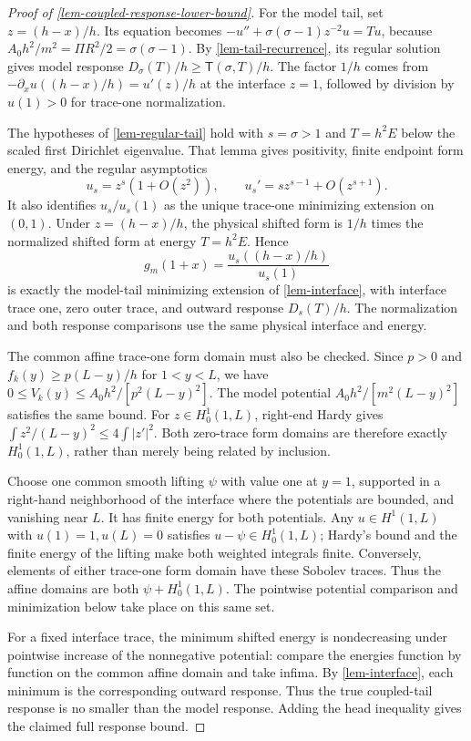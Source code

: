 \documentclass[11pt,a4paper]{article}
\theoremstyle{proofmanuscript}
\begin{document}
\begin{proof}[Proof of \ref{lem-coupled-response-lower-bound}]
For the model tail, set \(z=(h-x)/h\). Its equation becomes \(-u''+\sigma(\sigma-1)z^{-2}u=Tu\), because \(A_0h^2/m^2=\Pi R^2/2=\sigma(\sigma-1)\). By \ref{lem-tail-recurrence}, its regular solution gives model response \(D_\sigma(T)/h\ge\mathsf T(\sigma,T)/h\). The factor \(1/h\) comes from \(-\partial_x u((h-x)/h)=u'(z)/h\) at the interface \(z=1\), followed by division by \(u(1)>0\) for trace-one normalization.

The hypotheses of \ref{lem-regular-tail} hold with \(s=\sigma>1\) and \(T=h^2E\) below the scaled first Dirichlet eigenvalue. That lemma gives positivity, finite endpoint form energy, and the regular asymptotics \[
u_s=z^s(1+O(z^2)),\qquad
u_s'=s z^{s-1}+O(z^{s+1}).
\] It also identifies \(u_s/u_s(1)\) as the unique trace-one minimizing extension on \((0,1)\). Under \(z=(h-x)/h\), the physical shifted form is \(1/h\) times the normalized shifted form at energy \(T=h^2E\). Hence \[
g_m(1+x)=\frac{u_s((h-x)/h)}{u_s(1)}
\] is exactly the model-tail minimizing extension of \ref{lem-interface}, with interface trace one, zero outer trace, and outward response \(D_s(T)/h\). The normalization and both response comparisons use the same physical interface and energy.

The common affine trace-one form domain must also be checked. Since \(p>0\) and \(f_k(y)\ge p(L-y)/h\) for \(1<y<L\), we have \(0\le V_k(y)\le A_0h^2/[p^2(L-y)^2]\). The model potential \(A_0h^2/[m^2(L-y)^2]\) satisfies the same bound. For \(z\in H_0^1(1,L)\), right-end Hardy gives \(\int z^2/(L-y)^2\le4\int|z'|^2\). Both zero-trace form domains are therefore exactly \(H_0^1(1,L)\), rather than merely being related by inclusion.

Choose one common smooth lifting \(\psi\) with value one at \(y=1\), supported in a right-hand neighborhood of the interface where the potentials are bounded, and vanishing near \(L\). It has finite energy for both potentials. Any \(u\in H^1(1,L)\) with \(u(1)=1,u(L)=0\) satisfies \(u-\psi\in H_0^1(1,L)\); Hardy's bound and the finite energy of the lifting make both weighted integrals finite. Conversely, elements of either trace-one form domain have these Sobolev traces. Thus the affine domains are both \(\psi+H_0^1(1,L)\). The pointwise potential comparison and minimization below take place on this same set.

For a fixed interface trace, the minimum shifted energy is nondecreasing under pointwise increase of the nonnegative potential: compare the energies function by function on the common affine domain and take infima. By \ref{lem-interface}, each minimum is the corresponding outward response. Thus the true coupled-tail response is no smaller than the model response. Adding the head inequality gives the claimed full response bound.


\end{proof}
\end{document}
